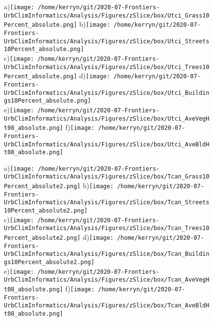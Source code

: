 \documentclass{article}
\begin{document}
\begin{figure}
\centering    
a)\texttt{[image: /home/kerryn/git/2020-07-Frontiers-UrbClimInformatics/Analysis/Figures/zSlice/box/Utci\_Grass10Percent\_absolute.png]}
b)\texttt{[image: /home/kerryn/git/2020-07-Frontiers-UrbClimInformatics/Analysis/Figures/zSlice/box/Utci\_Streets10Percent\_absolute.png]}\\
c)\texttt{[image: /home/kerryn/git/2020-07-Frontiers-UrbClimInformatics/Analysis/Figures/zSlice/box/Utci\_Trees10Percent\_absolute.png]}
d)\texttt{[image: /home/kerryn/git/2020-07-Frontiers-UrbClimInformatics/Analysis/Figures/zSlice/box/Utci\_Buildings10Percent\_absolute.png]}\\
e)\texttt{[image: /home/kerryn/git/2020-07-Frontiers-UrbClimInformatics/Analysis/Figures/zSlice/box/Utci\_AveVegHt08\_absolute.png]}
f)\texttt{[image: /home/kerryn/git/2020-07-Frontiers-UrbClimInformatics/Analysis/Figures/zSlice/box/Utci\_AveBldHt08\_absolute.png]}
\end{figure} 
\clearpage

















\begin{figure}
\centering    
a)\texttt{[image: /home/kerryn/git/2020-07-Frontiers-UrbClimInformatics/Analysis/Figures/zSlice/box/Tcan\_Grass10Percent\_absolute2.png]}
b)\texttt{[image: /home/kerryn/git/2020-07-Frontiers-UrbClimInformatics/Analysis/Figures/zSlice/box/Tcan\_Streets10Percent\_absolute2.png]}\\
c)\texttt{[image: /home/kerryn/git/2020-07-Frontiers-UrbClimInformatics/Analysis/Figures/zSlice/box/Tcan\_Trees10Percent\_absolute2.png]}
d)\texttt{[image: /home/kerryn/git/2020-07-Frontiers-UrbClimInformatics/Analysis/Figures/zSlice/box/Tcan\_Buildings10Percent\_absolute2.png]}\\
e)\texttt{[image: /home/kerryn/git/2020-07-Frontiers-UrbClimInformatics/Analysis/Figures/zSlice/box/Tcan\_AveVegHt08\_absolute.png]}
f)\texttt{[image: /home/kerryn/git/2020-07-Frontiers-UrbClimInformatics/Analysis/Figures/zSlice/box/Tcan\_AveBldHt08\_absolute.png]}
\end{figure} 
\clearpage
\end{document}
